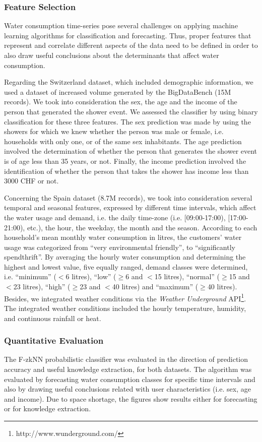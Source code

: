 \subsubsection{Feature Selection}
\label{subsec:feautures}
Water consumption time-series pose several challenges on applying machine learning algorithms for classification and forecasting. Thus, proper features that represent and correlate different aspects of the data need to be defined in order to also draw useful conclusions about the determinants that affect water consumption.

Regarding the Switzerland dataset, which included demographic information, we used a dataset of increased volume generated by the BigDataBench (15M records). We took into consideration the sex, the age and the income of the person that generated the shower event. We assessed the classifier by using binary classification for these three features. The sex prediction was made by using the showers for which we knew whether the person was male or female, i.e. households with only one, or of the same sex inhabitants. The age prediction involved the determination of whether the person that generates the shower event is of age less than 35 years, or not. Finally, the income prediction involved the identification of whether the person that takes the shower has income less than 3000 CHF or not. 

Concerning the Spain dataset (8.7M records), we took into consideration several temporal and seasonal features, expressed by different time intervals, which affect the water usage and demand, i.e. the daily time-zone (i.e. [09:00-17:00), [17:00-21:00), etc.), the hour, the weekday, the month and the season. According to each household's mean monthly water consumption in litres, the customers' water usage was categorized from ``very environmental friendly'', to ``significantly spendthrift''. By averaging the hourly water consumption and determining the highest and lowest value, five equally ranged, demand classes were determined, i.e. ``minimum'' ($<$6 litres), ``low'' ($\ge$6 and $<$15 litres), ``normal'' ($\ge$15 and $<$23 litres), ``high'' ($\ge$23 and $<$40 litres) and ``maximum'' ($\ge$40 litres). Besides, we integrated weather conditions via the \textit{Weather Underground} API\footnote{http://www.wunderground.com/}. The integrated weather conditions included the hourly temperature, humidity, and continuous rainfall or heat. 

\subsubsection{Quantitative Evaluation}
\label{subsec:fzknn_results}
The F-zkNN probabilistic classifier was evaluated in the direction of prediction accuracy and useful knowledge extraction, for both datasets. The algorithm was evaluated by forecasting water consumption classes for specific time intervals and also by drawing useful conclusions related with user characteristics (i.e. sex, age and income). Due to space shortage, the figures show results either for forecasting or for knowledge extraction.

